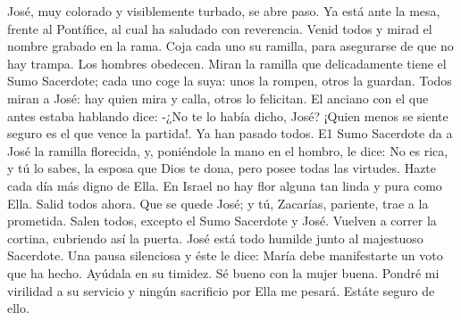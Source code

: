 \documentclass[12pt]{book} %
\begin{document}
José, muy colorado y visiblemente turbado, se abre paso. Ya está ante la mesa, frente al Pontífice, al cual ha saludado 
con reverencia. 
Venid todos y mirad el nombre grabado en la rama. Coja cada uno su ramilla, para asegurarse de que no hay trampa. 
Los hombres obedecen. Miran la ramilla que delicadamente tiene el Sumo Sacerdote; cada uno coge la suya: unos la 
rompen, otros la guardan. Todos miran a José: hay quien mira y calla, otros lo felicitan. El anciano con el que antes estaba hablando dice: 
-¿No te lo había dicho, José? ¡Quien menos se siente seguro es el que vence la partida!. Ya han pasado todos.    
E1 Sumo Sacerdote da a José la ramilla florecida, y, poniéndole la mano en el hombro, le dice: 
No es rica, y tú lo sabes, la esposa que Dios te dona, pero posee todas las virtudes. Hazte cada día más digno de Ella. En Israel no hay flor alguna tan linda y pura como Ella. Salid todos ahora. Que se quede José; y tú, Zacarías, pariente, trae a la prometida. 
Salen todos, excepto el Sumo Sacerdote y José. Vuelven a correr la cortina, cubriendo así la puerta. 
José está todo humilde junto al majestuoso Sacerdote. Una pausa silenciosa y éste le dice: 
María debe manifestarte un voto que ha hecho. Ayúdala en su timidez. Sé bueno con la mujer buena. 
Pondré mi virilidad a su servicio y ningún sacrificio por Ella me pesará. Estáte seguro de ello. 
 
\end{document}
